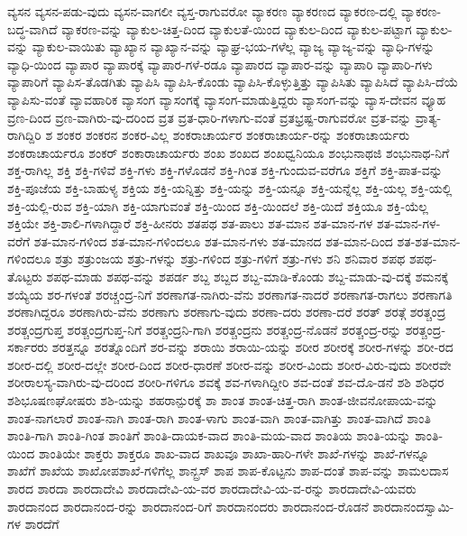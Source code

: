 {ವ್ಯಸನ
ವ್ಯಸನ-ಪಡು-ವುದು
ವ್ಯಸನ-ವಾಗಲೀ
ವ್ಯಸ್ತ-ರಾಗುವರೋ
ವ್ಯಾಕರಣ
ವ್ಯಾಕರಣದ
ವ್ಯಾಕರಣ-ದಲ್ಲಿ
ವ್ಯಾಕರಣ-ಬದ್ಧ-ವಾಗಿದೆ
ವ್ಯಾಕರಣ-ವನ್ನು
ವ್ಯಾಕುಲ-ಚಿತ್ತ-ದಿಂದ
ವ್ಯಾಕುಲತೆ-ಯಿಂದ
ವ್ಯಾಕುಲ-ದಿಂದ
ವ್ಯಾಕುಲ-ಪಟ್ಟಾಗ
ವ್ಯಾಕುಲ-ವನ್ನು
ವ್ಯಾಕುಲ-ವಾಯಿತು
ವ್ಯಾಖ್ಯಾನ
ವ್ಯಾಖ್ಯಾನ-ವನ್ನು
ವ್ಯಾಘ್ರ-ಭಯ-ಗಳೆಲ್ಲ
ವ್ಯಾಜ್ಯ
ವ್ಯಾಜ್ಯ-ವನ್ನು
ವ್ಯಾಧಿ-ಗಳನ್ನು
ವ್ಯಾಧಿ-ಯಿಂದ
ವ್ಯಾಪಾರ
ವ್ಯಾಪಾರಕ್ಕೆ
ವ್ಯಾಪಾರ-ಗಳೆ-ರಡೂ
ವ್ಯಾಪಾರದ
ವ್ಯಾಪಾರ-ವನ್ನು
ವ್ಯಾಪಾರಿ
ವ್ಯಾಪಾರಿ-ಗಳು
ವ್ಯಾಪಾರಿಗೆ
ವ್ಯಾಪಿಸ-ತೊಡಗಿತು
ವ್ಯಾಪಿಸಿ
ವ್ಯಾಪಿಸಿ-ಕೊಂಡು
ವ್ಯಾಪಿಸಿ-ಕೊಳ್ಳುತ್ತಿತ್ತು
ವ್ಯಾಪಿಸಿತು
ವ್ಯಾಪಿಸಿದೆ
ವ್ಯಾಪಿಸಿ-ದೆಯೆ
ವ್ಯಾಪಿಸು-ವಂತೆ
ವ್ಯಾವಹಾರಿಕ
ವ್ಯಾಸಂಗ
ವ್ಯಾಸಂಗಕ್ಕೆ
ವ್ಯಾಸಂಗ-ಮಾಡುತ್ತಿದ್ದರು
ವ್ಯಾಸಂಗ-ವನ್ನು
ವ್ಯಾಸ-ದೇವನ
ವ್ಯೂಹ
ವ್ರಣ-ದಿಂದ
ವ್ರಣ-ವಾಗಿರು-ವು-ದರಿಂದ
ವ್ರತ
ವ್ರತ-ಧಾರಿ-ಗಳಾಗು-ವಂತೆ
ವ್ರತಭ್ರಷ್ಟ-ರಾಗುವರೋ
ವ್ರತ-ವನ್ನು
ವ್ರಾತ್ಯ-ರಾಗಿದ್ದಿರಿ
ಶ
ಶಂಕರ
ಶಂಕರನ
ಶಂಕರ-ವಿಲ್ಲ
ಶಂಕರಾಚಾರ್ಯರ
ಶಂಕರಾಚಾರ್ಯ-ರನ್ನು
ಶಂಕರಾಚಾರ್ಯರು
ಶಂಕರಾಚಾರ್ಯರೂ
ಶಂಕರ್
ಶಂಕಾರಾಚಾರ್ಯರು
ಶಂಖ
ಶಂಖದ
ಶಂಖಧ್ವನಿಯೂ
ಶಂಭುನಾಥಜಿ
ಶಂಭುನಾಥ-ನಿಗೆ
ಶಕ್ತ-ರಾಗಿಲ್ಲ
ಶಕ್ತಿ
ಶಕ್ತಿ-ಗಳಿವೆ
ಶಕ್ತಿ-ಗಳು
ಶಕ್ತಿ-ಗಳೊಡನೆ
ಶಕ್ತಿ-ಗಿಂತ
ಶಕ್ತಿ-ಗುಂದುವ-ವರೆಗೂ
ಶಕ್ತಿಗೆ
ಶಕ್ತಿ-ಪಾತ-ವನ್ನು
ಶಕ್ತಿ-ಪೂಜೆಯ
ಶಕ್ತಿ-ಬಾಹುಳ್ಯ
ಶಕ್ತಿಯ
ಶಕ್ತಿ-ಯನ್ನಿತ್ತು
ಶಕ್ತಿ-ಯನ್ನು
ಶಕ್ತಿ-ಯನ್ನೂ
ಶಕ್ತಿ-ಯನ್ನೆಲ್ಲ
ಶಕ್ತಿ-ಯಲ್ಲ
ಶಕ್ತಿ-ಯಲ್ಲಿ
ಶಕ್ತಿ-ಯಲ್ಲಿ-ರುವ
ಶಕ್ತಿ-ಯಾಗಿ
ಶಕ್ತಿ-ಯಾಗುವಂತೆ
ಶಕ್ತಿ-ಯಿಂದ
ಶಕ್ತಿ-ಯಿಂದಲೆ
ಶಕ್ತಿ-ಯಿದೆ
ಶಕ್ತಿಯೂ
ಶಕ್ತಿ-ಯೆಲ್ಲ
ಶಕ್ತಿಯೇ
ಶಕ್ತಿ-ಶಾಲಿ-ಗಳಾಗಿದ್ದಾರೆ
ಶಕ್ತಿ-ಹೀನರು
ಶತಪಥ
ಶತ-ಪಾಲು
ಶತ-ಮಾನ
ಶತ-ಮಾನ-ಗಳ
ಶತ-ಮಾನ-ಗಳ-ವರೆಗೆ
ಶತ-ಮಾನ-ಗಳಿಂದ
ಶತ-ಮಾನ-ಗಳಿಂದಲೂ
ಶತ-ಮಾನ-ಗಳು
ಶತ-ಮಾನದ
ಶತ-ಮಾನ-ದಿಂದ
ಶತ-ಶತ-ಮಾನ-ಗಳಿಂದಲೂ
ಶತ್ರು
ಶತ್ರುಂಜಯ
ಶತ್ರು-ಗಳನ್ನು
ಶತ್ರು-ಗಳಿಂದ
ಶತ್ರು-ಗಳಿಗೆ
ಶತ್ರು-ಗಳು
ಶನಿ
ಶನಿವಾರ
ಶಪಥ
ಶಪಥ-ತೊಟ್ಟರು
ಶಪಥ-ಮಾಡು
ಶಪಥ-ವನ್ನು
ಶಪರ್ಡ
ಶಬ್ದ
ಶಬ್ದದ
ಶಬ್ದ-ಮಾಡಿ-ಕೊಂಡು
ಶಬ್ದ-ಮಾಡು-ವು-ದಕ್ಕೆ
ಶಮನಕ್ಕೆ
ಶಯ್ಯೆಯ
ಶರ-ಗಳಂತೆ
ಶರಚ್ಚಂದ್ರ-ನಿಗೆ
ಶರಣಾಗತ-ನಾಗಿರು-ವೆನು
ಶರಣಾಗತ-ನಾದರೆ
ಶರಣಾಗತ-ರಾಗಲು
ಶರಣಾಗತಿ
ಶರಣಾಗಿದ್ದರೂ
ಶರಣಾಗಿರು-ವೆನು
ಶರಣಾಗು
ಶರಣಾಗು-ವುದು
ಶರಣಾ-ದರು
ಶರಣಾ-ದರೆ
ಶರತ್
ಶರತ್ಗೆ
ಶರತ್ಚಂದ್ರ
ಶರತ್ಚಂದ್ರಗುಪ್ತ
ಶರತ್ಚಂದ್ರಗುಪ್ತ-ನಿಗೆ
ಶರತ್ಚಂದ್ರನಿ-ಗಾಗಿ
ಶರತ್ಚಂದ್ರನು
ಶರತ್ಚಂದ್ರ-ನೊಡನೆ
ಶರತ್ಚಂದ್ರ-ರನ್ನು
ಶರತ್ಚಂದ್ರ-ಸರ್ಕಾರರು
ಶರತ್ತನ್ನೂ
ಶರತ್ನೊಂದಿಗೆ
ಶರ-ವನ್ನು
ಶರಾಯಿ
ಶರಾಯಿ-ಯನ್ನು
ಶರೀರ
ಶರೀರಕ್ಕೆ
ಶರೀರ-ಗಳನ್ನು
ಶರೀ-ರದ
ಶರೀರ-ದಲ್ಲಿ
ಶರೀರ-ದಲ್ಲೇ
ಶರೀರ-ದಿಂದ
ಶರೀರ-ಧಾರಣೆ
ಶರೀರ-ವನ್ನು
ಶರೀರ-ವಿಂದು
ಶರೀರ-ವಿರು-ವುದು
ಶರೀರವೇ
ಶರೀರಾಲಸ್ಯ-ವಾಗಿರು-ವು-ದರಿಂದ
ಶರೀರಿ-ಗಳಿಗೂ
ಶವಕ್ಕೆ
ಶವ-ಗಳಾಗಿದ್ದೀರಿ
ಶವ-ದಂತೆ
ಶವ-ದೊ-ಡನೆ
ಶಶಿ
ಶಶಿಧರ
ಶಶಿಭೂಷಣಘೋಷರು
ಶಶಿ-ಯನ್ನು
ಶಹರಾನ್ಪುರಕ್ಕೆ
ಶಾ
ಶಾಂತ
ಶಾಂತ-ಚಿತ್ತ-ರಾಗಿ
ಶಾಂತ-ಜೀವನೋಪಾಯ-ವನ್ನು
ಶಾಂತ-ನಾಗಲಾರೆ
ಶಾಂತ-ನಾಗಿ
ಶಾಂತ-ರಾಗಿ
ಶಾಂತ-ಳಾಗು
ಶಾಂತ-ವಾಗಿ
ಶಾಂತ-ವಾಗಿತ್ತು
ಶಾಂತ-ವಾಗಿದೆ
ಶಾಂತಿ
ಶಾಂತಿ-ಗಾಗಿ
ಶಾಂತಿ-ಗಿಂತ
ಶಾಂತಿಗೆ
ಶಾಂತಿ-ದಾಯಕ-ವಾದ
ಶಾಂತಿ-ಮಯ-ವಾದ
ಶಾಂತಿಯ
ಶಾಂತಿ-ಯನ್ನು
ಶಾಂತಿ-ಯಿಂದ
ಶಾಂತಿಯೇ
ಶಾಕ್ತರು
ಶಾಕ್ತರೂ
ಶಾಖ-ವಾದ
ಶಾಖವೂ
ಶಾಖಾ-ಹಾರಿ-ಗಳೇ
ಶಾಖೆ-ಗಳನ್ನು
ಶಾಖೆ-ಗಳನ್ನೂ
ಶಾಖೆಗೆ
ಶಾಖೆಯ
ಶಾಖೋಪಶಾಖೆ-ಗಳಿಗೆಲ್ಲ
ಶಾನ್ಬ್ರಸ್
ಶಾಪ
ಶಾಪ-ಕೊಟ್ಟನು
ಶಾಪ-ದಂತೆ
ಶಾಪ-ವನ್ನು
ಶಾಮಲದಾಸ
ಶಾರದ
ಶಾರದಾ
ಶಾರದಾದೇವಿ
ಶಾರದಾದೇವಿ-ಯ-ವರ
ಶಾರದಾದೇವಿ-ಯ-ವ-ರನ್ನು
ಶಾರದಾದೇವಿ-ಯವರು
ಶಾರದಾನಂದ
ಶಾರದಾನಂದ-ರನ್ನು
ಶಾರದಾನಂದ-ರಿಗೆ
ಶಾರದಾನಂದರು
ಶಾರದಾನಂದ-ರೊಡನೆ
ಶಾರದಾನಂದಸ್ವಾಮಿ-ಗಳ
ಶಾರದೆಗೆ
}
